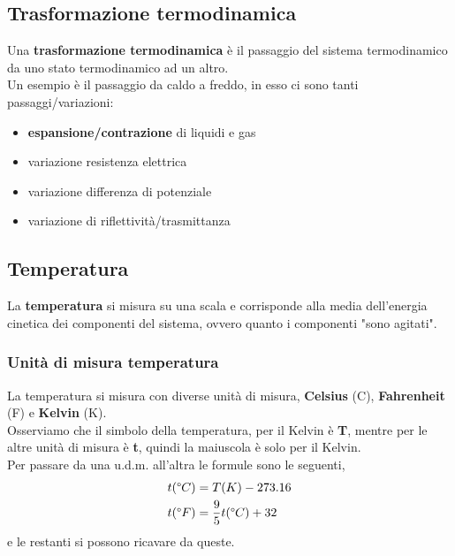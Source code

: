     \subsection{Trasformazione termodinamica}
        Una \textbf{trasformazione termodinamica} è il passaggio del sistema termodinamico da uno stato termodinamico ad un altro.\\
        Un esempio è il passaggio da caldo a freddo, in esso ci sono tanti passaggi/variazioni:
        \begin{itemize}
            \item \textbf{espansione/contrazione} di liquidi e gas\\
            \item variazione resistenza elettrica\\
            \item variazione differenza di potenziale\\
            \item variazione di riflettività/trasmittanza
        \end{itemize}

    \subsection{Temperatura}
        La \textbf{temperatura} si misura su una scala e corrisponde alla media dell'energia cinetica dei componenti del sistema, ovvero quanto i componenti "sono agitati".

        \subsubsection{Unità di misura temperatura}
            La temperatura si misura con diverse unità di misura, \textbf{Celsius} (\degree{}C), \textbf{Fahrenheit} (\degree{}F) e \textbf{Kelvin} (K).\\
            Osserviamo che il simbolo della temperatura, per il Kelvin è \textbf{T}, mentre per le altre unità di misura è \textbf{t}, quindi la maiuscola è solo per il Kelvin.\\
            Per passare da una u.d.m. all'altra le formule sono le seguenti,
            \begin{align*}
                &t(\degree{}C)=T(K) - 273.16\\
                &t(\degree{}F)=\frac{9}{5}t(\degree{}C) + 32
            \end{align*}
            e le restanti si possono ricavare da queste.


